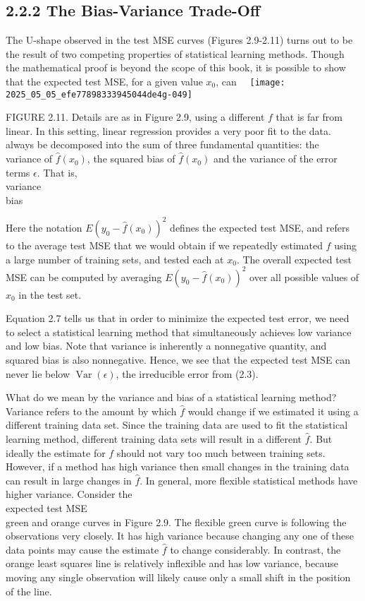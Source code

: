\documentclass[10pt]{article}
\begin{document}
\subsection*{2.2.2 The Bias-Variance Trade-Off}
The U-shape observed in the test MSE curves (Figures 2.9-2.11) turns out to be the result of two competing properties of statistical learning methods. Though the mathematical proof is beyond the scope of this book, it is possible to show that the expected test MSE, for a given value $x_{0}$, can\
\
\texttt{[image: 2025\_05\_05\_efe77898333945044de4g-049]}

FIGURE 2.11. Details are as in Figure 2.9, using a different $f$ that is far from linear. In this setting, linear regression provides a very poor fit to the data.\\
always be decomposed into the sum of three fundamental quantities: the\\
variance of $\hat{f}\left(x_{0}\right)$, the squared bias of $\hat{f}\left(x_{0}\right)$ and the variance of the error terms $\epsilon$. That is,\\
variance\\
bias

Here the notation $E\left(y_{0}-\hat{f}\left(x_{0}\right)\right)^{2}$ defines the expected test MSE, and refers to the average test MSE that we would obtain if we repeatedly estimated $f$ using a large number of training sets, and tested each at $x_{0}$. The overall expected test MSE can be computed by averaging $E\left(y_{0}-\hat{f}\left(x_{0}\right)\right)^{2}$ over all possible values of $x_{0}$ in the test set.

Equation 2.7 tells us that in order to minimize the expected test error, we need to select a statistical learning method that simultaneously achieves low variance and low bias. Note that variance is inherently a nonnegative quantity, and squared bias is also nonnegative. Hence, we see that the expected test MSE can never lie below $\operatorname{Var}(\epsilon)$, the irreducible error from (2.3).

What do we mean by the variance and bias of a statistical learning method? Variance refers to the amount by which $\hat{f}$ would change if we estimated it using a different training data set. Since the training data are used to fit the statistical learning method, different training data sets will result in a different $\hat{f}$. But ideally the estimate for $f$ should not vary too much between training sets. However, if a method has high variance then small changes in the training data can result in large changes in $\hat{f}$. In general, more flexible statistical methods have higher variance. Consider the\\
expected test MSE\\
green and orange curves in Figure 2.9. The flexible green curve is following the observations very closely. It has high variance because changing any one of these data points may cause the estimate $\hat{f}$ to change considerably. In contrast, the orange least squares line is relatively inflexible and has low variance, because moving any single observation will likely cause only a small shift in the position of the line.
\end{document}
